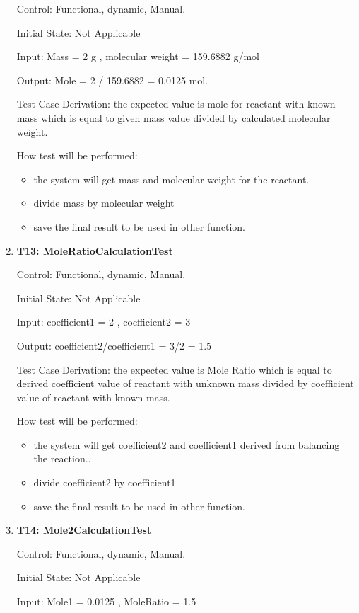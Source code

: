 \documentclass[12pt, titlepage]{article}
\begin{document}
\begin{enumerate}
Control: Functional, dynamic, Manual.
					
Initial State: Not Applicable
					
Input: Mass = 2 g , molecular weight = 159.6882 g/mol
			
Output:  Mole = 2 / 159.6882 =  0.0125 mol. 

Test Case Derivation: the expected value is mole for reactant with known mass which is equal to given mass value divided by calculated molecular weight. 	
				
How test will be performed: 
\begin{itemize}
\item the system will get mass and molecular weight  for the reactant.
\item divide mass by molecular weight 
\item save the final result to be used in other function.
\end{itemize}

\item{\bf T13: MoleRatioCalculationTest \\}

Control: Functional, dynamic, Manual.
					
Initial State: Not Applicable
					
Input: coefficient1 = 2  , coefficient2 = 3
			
Output:  coefficient2/coefficient1 = 3/2 = 1.5 

Test Case Derivation: the expected value is Mole Ratio which is equal to derived coefficient value of reactant with unknown mass divided by coefficient value of reactant with known mass.
 					
How test will be performed: 
\begin{itemize}
\item the system will get coefficient2 and coefficient1 derived from balancing the reaction..
\item divide coefficient2 by coefficient1  
\item save the final result to be used in other function.
\end{itemize}

\item{\bf T14: Mole2CalculationTest\\}

Control: Functional, dynamic, Manual.
					
Initial State: Not Applicable
					
Input: Mole1 = 0.0125  , MoleRatio = 1.5
			

\end{enumerate}
\end{document}
